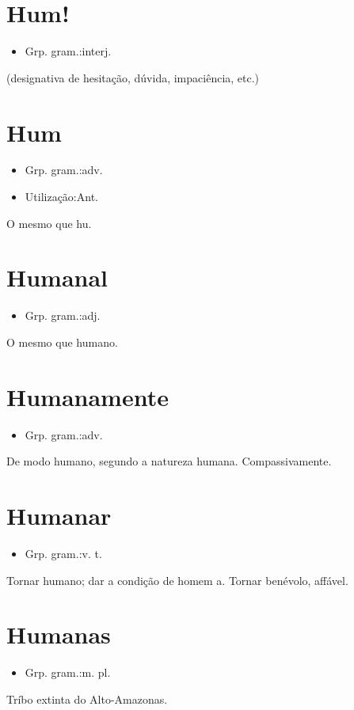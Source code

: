 \documentclass{article}
\begin{document}
\section{Hum!}
\begin{itemize}
\item {Grp. gram.:interj.}
\end{itemize}
(designativa de hesitação, dúvida, impaciência, etc.)
\section{Hum}
\begin{itemize}
\item {Grp. gram.:adv.}
\end{itemize}
\begin{itemize}
\item {Utilização:Ant.}
\end{itemize}
O mesmo que \textunderscore hu\textunderscore .
\section{Humanal}
\begin{itemize}
\item {Grp. gram.:adj.}
\end{itemize}
O mesmo que \textunderscore humano\textunderscore .
\section{Humanamente}
\begin{itemize}
\item {Grp. gram.:adv.}
\end{itemize}
De modo humano, segundo a natureza humana.
Compassivamente.
\section{Humanar}
\begin{itemize}
\item {Grp. gram.:v. t.}
\end{itemize}
Tornar humano; dar a condição de homem a.
Tornar benévolo, affável.
\section{Humanas}
\begin{itemize}
\item {Grp. gram.:m. pl.}
\end{itemize}
Tríbo extinta do Alto-Amazonas.
\end{document}
